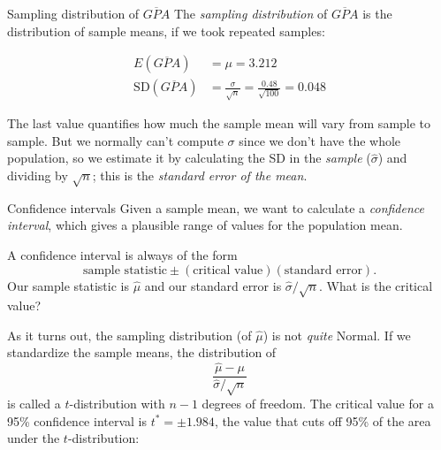 \documentclass{beamer}\usepackage[]{graphicx}\usepackage[]{color}
\newenvironment{knitrout}{}{} %
\begin{document}
\begin{darkframes}
\begin{frame}[fragile]
\begin{knitrout}
\end{knitrout}
\end{frame}


\begin{frame}[fragile]{Sampling distribution of $\overline{GPA}$}
The \emph{sampling distribution} of $\overline{GPA}$ is the distribution of sample means, if we took repeated samples:

\begin{align*}
  E(\overline{GPA}) &= \mu = 3.212 \\
  \text{SD}(\overline{GPA}) &= \frac{\sigma}{\sqrt n} = \frac{0.48}{\sqrt{100}} = 0.048
\end{align*}

The last value quantifies how much the sample mean will vary from sample to sample. But we normally can't compute $\sigma$ since we don't have the whole population, so we estimate it by calculating the SD in the \emph{sample} ($\hat\sigma$) and dividing by $\sqrt n$; this is the \emph{standard error of the mean}.
\end{frame}


\begin{frame}{Confidence intervals}
Given a sample mean, we want to calculate a \emph{confidence interval}, which gives a plausible range of values for the population mean.
\pause

A confidence interval is always of the form
\[
  \text{sample statistic} \pm (\text{critical value})(\text{standard error}).
\]
\pause
Our sample statistic is $\hat\mu$ and our standard error is $\hat\sigma/\sqrt n$.
\pause
What is the critical value?
\end{frame}


\begin{frame}
As it turns out, the sampling distribution (of $\hat\mu$) is not \emph{quite} Normal. If we standardize the sample means, the distribution of \[ \frac{\hat\mu - \mu}{ \hat\sigma/\sqrt n } \] is called a $t$-distribution with $n-1$ degrees of freedom. \pause The critical value for a 95\% confidence interval is $t^*=\pm1.984$, the value that cuts off 95\% of the area under the $t$-distribution:

\begin{knitrout}



\end{knitrout}
\end{frame}
\end{darkframes}
\end{document}
